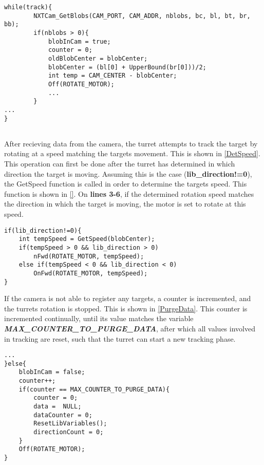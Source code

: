 \begin{minipage}[H]{\linewidth}
\begin{lstlisting}[caption = First part of the general tracking behaviour., label = TrackFirst] while(track){
        NXTCam_GetBlobs(CAM_PORT, CAM_ADDR, nblobs, bc, bl, bt, br, bb);
        if(nblobs > 0){
            blobInCam = true;
            counter = 0;
            oldBlobCenter = blobCenter;
            blobCenter = (bl[0] + UpperBound(br[0]))/2;
            int temp = CAM_CENTER - blobCenter;
            Off(ROTATE_MOTOR);
            ...
        }
...
}        
            
\end{lstlisting}
\end{minipage}

After recieving data from the camera, the turret attempts to track the target by
rotating at a speed matching the targets movement. This is shown in
\autoref{DetSpeed}. This operation can first be done after the turret has
determined in which direction the target is moving. Assuming this is the case
(\textbf{lib\_direction!=0}), the GetSpeed function is called in order to
determine the targets speed. This function is shown in \autoref{}. On
\textbf{lines 3-6}, if the determined rotation speed matches the direction in
which the target is moving, the motor is set to rotate at this speed.\nl

\begin{minipage}[H]{\linewidth}
\begin{lstlisting}[caption = Determine the targets speed at rotate to match it, label = DetSpeed] 
if(lib_direction!=0){
	int tempSpeed = GetSpeed(blobCenter);
	if(tempSpeed > 0 && lib_direction > 0)
		nFwd(ROTATE_MOTOR, tempSpeed);
	else if(tempSpeed < 0 && lib_direction < 0)
		OnFwd(ROTATE_MOTOR, tempSpeed);
}
\end{lstlisting}
\end{minipage}

If the camera is not able to register any targets, a counter is incremented, and
the turrets rotation is stopped. This is shown in \autoref{PurgeData}. This
counter is incremented continually, until its value matches the variable
\textbf{\textit{MAX\_COUNTER\_TO\_PURGE\_DATA}}, after which all values involved
in tracking are reset, such that the turret can start a new tracking phase.

\begin{minipage}[H]{\linewidth}
\begin{lstlisting}[caption = Reset data and turn off motor is no targets are found., label = PurgeData] 
...
}else{
	blobInCam = false;
    counter++;
    if(counter == MAX_COUNTER_TO_PURGE_DATA){
    	counter = 0;
        data =  NULL;
        dataCounter = 0;
        ResetLibVariables();
        directionCount = 0;
    }
    Off(ROTATE_MOTOR);
}
\end{lstlisting}
\end{minipage}

